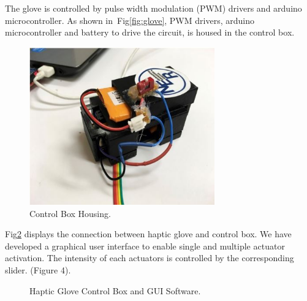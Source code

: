 The glove is controlled by pulse width modulation (PWM) drivers and arduino microcontroller. As shown in~Fig\ref{fig:glove}, PWM drivers, arduino microcontroller and battery to drive the circuit, is housed in the control box.

\begin{figure}[!ht]
  \centering
  \includegraphics[width=8cm]{figures/figure2.jpg}
  \caption{Control Box Housing.}
  \label{fig:box}
\end{figure}


Fig\ref{fig:glove-gui} displays the connection between haptic glove and control
box. We have developed a graphical user interface to enable single and
multiple actuator activation. The intensity of each actuators is
controlled by the corresponding slider.  (Figure 4).

\begin{figure}[!ht]
  \centering
  \caption{Haptic Glove Control Box and GUI Software.}
  \label{fig:glove-gui}
\end{figure}

